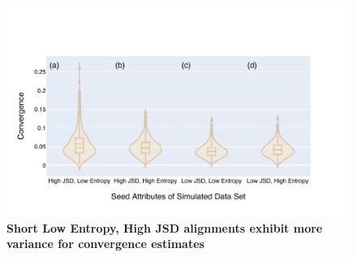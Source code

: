 \begin{figure}[!ht]
\centering
\includegraphics[width=\textwidth]{figures/plots/synthetic/convergence/300bp.pdf}
\caption{\textbf{Short Low Entropy, High JSD alignments exhibit more variance for convergence estimates }}
\label{fig:convergence-short}
\end{figure}